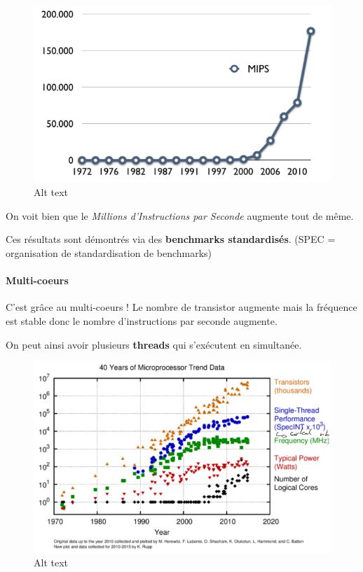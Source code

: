 \begin{figure}
\centering
\includegraphics{image-22.png}
\caption{Alt text}
\end{figure}

On voit bien que le \emph{Millions d'Instructions par Seconde} augmente
tout de même.

Ces résultats sont démontrés via des \textbf{benchmarks standardisés}.
(SPEC = organisation de standardisation de benchmarks)

\paragraph{Multi-coeurs}\label{multi-coeurs}

C'est grâce au multi-coeurs ! Le nombre de transistor augmente mais la
fréquence est stable donc le nombre d'instructions par seconde augmente.

On peut ainsi avoir plusieurs \textbf{threads} qui s'exécutent en
simultanée.

\begin{figure}
\centering
\includegraphics{image-23.png}
\caption{Alt text}
\end{figure}

